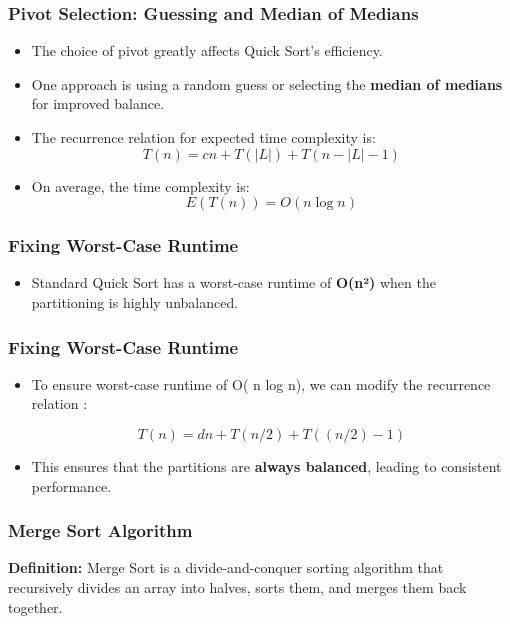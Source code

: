 \begin{frame}
    \frametitle{Pivot Selection: Guessing and Median of Medians}
    \begin{itemize}
        \item The choice of pivot greatly affects Quick Sort’s efficiency.
        \item One approach is using a random guess or selecting the \textbf{median of medians} for improved balance.
        \item The recurrence relation for expected time complexity is:
        \[
        T(n) = cn + T(|L|) + T(n - |L| - 1)
        \]
         \item On average, the time complexity is:
        \[
        E(T(n)) = O(n \log n)
        \]
        
    \end{itemize}
\end{frame}


\begin{frame}
    \frametitle{Fixing Worst-Case Runtime}
    \begin{itemize}
        
        \item Standard Quick Sort has a worst-case runtime of \textbf{O(n²)} when the partitioning is highly unbalanced.
        
        
    \end{itemize}
\end{frame}

\begin{frame}

\frametitle{Fixing Worst-Case Runtime}
\begin{itemize}
    \item To ensure worst-case runtime of O( n log n), we can modify the 
          recurrence relation :
          
     \[    T(n) = dn + T(n/2) + T((n/2)-1)\]
    
    \item This ensures that the partitions are \textbf{always balanced}, leading to consistent performance.
    
\end{itemize}
\end{frame}


\begin{frame}
    \frametitle{Merge Sort Algorithm}
    
    \textbf{Definition:} Merge Sort is a divide-and-conquer sorting algorithm that recursively divides an array into halves, sorts them, and merges them back together.
    
    



\end{frame}

